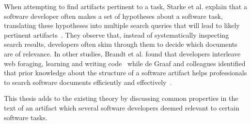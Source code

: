 When attempting to find artifacts pertinent to a task, 
Starke et al. explain that a software developer often makes a set of hypotheses about a software task,
translating these hypotheses into multiple search queries that will lead to  likely pertinent artifacts~\cite{Starke2009}. 
They observe that, instead of systematically inspecting search results,
developers often skim through them to decide which documents are of relevance. 
In other studies, Brandt et al. found that developers interleave web foraging, learning and writing code~\cite{Brandt2009a} while de Graaf and colleagues 
identified that prior knowledge about the structure of a software artifact helps professionals
to search software documents efficiently and effectively~\cite{DeGraaf2014}.


This thesis adds to the existing theory by discussing 
common properties in the text of an artifact which several software developers deemed relevant 
to certain software tasks.  
